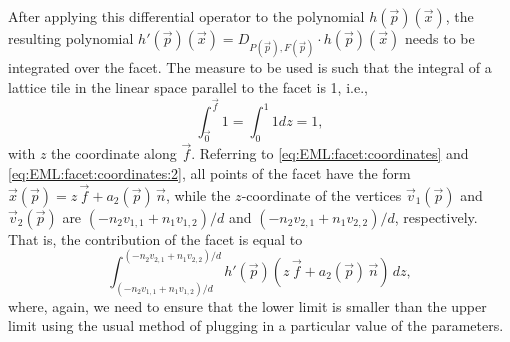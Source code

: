 After applying this differential operator to the polynomial
$h(\vec p)(\vec x)$, the resulting polynomial
$
h'(\vec p)(\vec x) = D_{P(\vec p), F(\vec p)} \cdot h(\vec p)(\vec x)
$
needs to be integrated over the facet.
The measure to be used is such that the integral of a lattice tile
in the linear space parallel to the facet is 1, i.e.,
$$
\int_{\vec 0}^{\vec f} 1 = \int_0^1 1 dz = 1,
$$
with $z$ the coordinate along $\vec f$.
Referring to \eqref{eq:EML:facet:coordinates} and
\eqref{eq:EML:facet:coordinates:2}, all points of the facet
have the form $\vec x(\vec p) = z \, \vec f + a_2(\vec p) \, \vec n$,
while the $z$-coordinate of the vertices $\vec v_1(\vec p)$
and $\vec v_2(\vec p)$ are
$(-n_2 v_{1,1} + n_1 v_{1,2})/d$
and
$(-n_2 v_{2,1} + n_1 v_{2,2})/d$, respectively.
That is, the contribution of the facet is equal to
$$
\int_{(-n_2 v_{1,1} + n_1 v_{1,2})/d}^{(-n_2 v_{2,1} + n_1 v_{2,2})/d}
h'(\vec p)\left(z \, \vec f + a_2(\vec p) \, \vec n\right) \, dz
,
$$
where, again, we need to ensure that the lower limit is smaller
than the upper limit using the usual method of plugging in a
particular value of the parameters.

